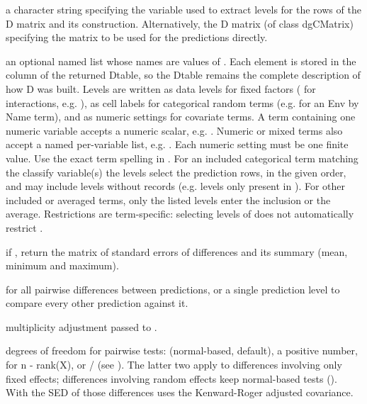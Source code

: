 \documentclass[a4paper]{book}
\begin{document}
\begin{Arguments}
\begin{ldescription}
\item[\code{D}] a character string specifying the variable used to extract levels for the rows of the D matrix and its construction. Alternatively, the D matrix (of class dgCMatrix) specifying the matrix to be used for the predictions directly.
\item[\code{levels}] an optional named list whose names are values of .
Each element is stored in the  column of the returned Dtable,
so the Dtable remains the complete description of how D was built. Levels
are written as data levels for fixed factors ( for
interactions, e.g. ), as cell labels for categorical random
terms (e.g.  for an Env by Name term), and as numeric
settings for covariate terms. A term containing one numeric variable accepts
a numeric scalar, e.g. . Numeric or mixed
terms also accept a named per-variable list, e.g.
.
Each numeric setting must be one finite value. Use the exact term spelling
in . For an included categorical term matching the classify
variable(s) the levels select the prediction rows, in the given order, and
may include levels without records (e.g. levels only present in ).
For other included or averaged terms, only the listed levels enter the
inclusion or the average. Restrictions are term-specific: selecting levels
of  does not automatically restrict .
\item[\code{sed}] if , return the matrix of standard errors of differences
 and its summary  (mean, minimum and maximum).
\item[\code{pairwise}]  for all pairwise differences between predictions,
or a single prediction level to compare every other prediction against it.
\item[\code{adjust}] multiplicity adjustment passed to .
\item[\code{df}] degrees of freedom for pairwise tests:  (normal-based,
default), a positive number,  for n - rank(X), or
/ (see ). The latter
two apply to differences involving only fixed effects; differences involving
random effects keep normal-based tests (). With  the
SED of those differences uses the Kenward-Roger adjusted covariance.

\end{ldescription}
\end{Arguments}
\end{document}
